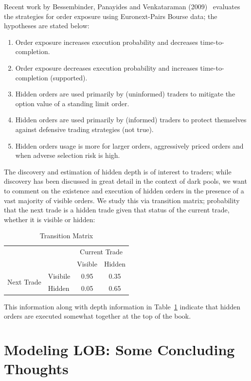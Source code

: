 Recent work by Bessembinder, Panayides and Venkataraman (2009)~\cite{bessenbinder} evaluates the strategies for order exposure using Euronext-Pairs Bourse data; the hypotheses are stated below:
	\begin{enumerate}[--]
	\item Order exposure increases execution probability and decreases time-to-completion.
	\item Order exposure decreases execution probability and increases time-to-completion (supported).
	\item Hidden orders are used primarily by (uninformed) traders to mitigate the option value of a standing limit order.
	\item Hidden orders are used primarily by (informed) traders to protect themselves against defensive trading strategies (not true).
	\item Hidden orders usage is more for larger orders, aggressively priced orders and when adverse selection risk is high.
	\end{enumerate}
The discovery and estimation of hidden depth is of interest to traders; while discovery has been discussed in great detail in the context of dark pools, we want to comment on the existence and execution of hidden orders in the presence of a vast majority of visible orders. We study this via transition matrix; probability that the next trade is a hidden trade given that status of the current trade, whether it is visible or hidden:

	\begin{table}[!ht]
	\centering
	\caption{Transition Matrix\label{tab:transmatrix}}
	\begin{tabular}{c l | cc}
	& & \multicolumn{2}{c}{Current Trade} \\
	& & Visible & Hidden \\ \hline
	\multirow{2}{*}{Next Trade} & Visibile & 0.95 & 0.35 \\
	& Hidden & 0.05 & 0.65
	\end{tabular}
	\end{table}

\noindent This information along with depth information in Table~\ref{tab:transmatrix} indicate that hidden orders are executed somewhat together at the top of the book. \label{in:hidden3}



\section{Modeling LOB: Some Concluding Thoughts\label{sec:lob_conclude}}

